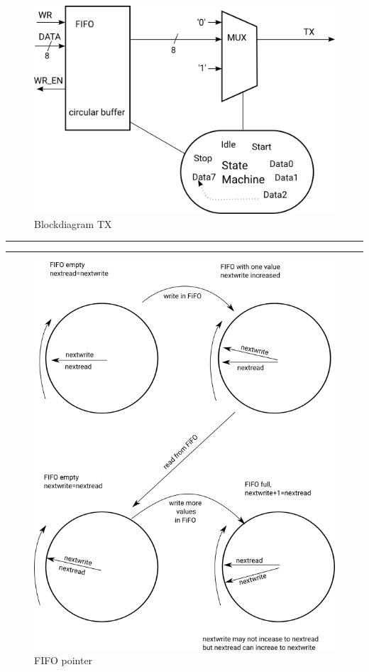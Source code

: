 \documentclass[a4paper,11pt]{article}
\begin{document}
\begin{figure}[H]
  \begin{center}
    \includegraphics[scale=0.5]{tx/BlockTX.png}
    \caption{Blockdiagram TX}
    \label{fig:Blockdiagram}
  \end{center}
\end{figure}
\hrule

\hrule
\vspace{10pt}
\begin{figure}[H]
  \begin{center}
    \includegraphics[scale=0.4]{tx/path6054.png}
    \caption{FIFO pointer}
    \label{fig:FIFO pointer}
  \end{center}
\end{figure}
\end{document}
